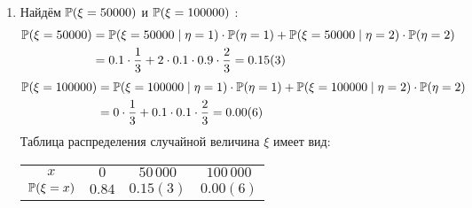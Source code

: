 \begin{enumerate}
\begin{enumerate}
\item Найдём $\P (\xi = 50000 )$ и $\P (\xi = 100000 )$ :
\begin{align*}
\P (\xi = 50000 ) &= \P (\xi = 50000 \mid \eta = 1 ) \cdot \P ( \eta = 1  ) +  \P (\xi = 50000 \mid \eta = 2 ) \cdot  \P ( \eta = 2 ) \\
&= 0.1 \cdot \frac{1}{3} + 2 \cdot 0.1 \cdot 0.9 \cdot \frac{2}{3} = 0.15(3)
\end{align*}
\begin{align*}
\P (\xi = 100000 ) &=  \P (\xi = 100000 \mid \eta = 1 ) \cdot \P ( \eta = 1 ) +  \P (\xi = 100000 \mid \eta = 2 ) \cdot  \P ( \eta = 2  ) \\
&= 0 \cdot \frac{1}{3} + 0.1\cdot 0.1  \cdot \frac{2}{3} = 0.00(6)
\end{align*}
Таблица распределения случайной величина $\xi$ имеет вид:

\begin{center}
\begin{tabular}{cccc}
\toprule
$x$ & $ 0 $ & $50\,000$ & $100\,000$ \\
$\P(\xi = x)$ & $0.84$ & $0.15(3)$ & $0.00(6)$ \\ \bottomrule
\end{tabular}
\end{center}


\end{enumerate}
\end{enumerate}
